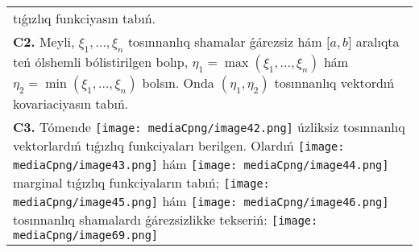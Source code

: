 \documentclass{article}
\begin{document}
\begin{tabular}{m{17cm}}
tıǵızlıq funkciyasın tabıń.
 \\
\textbf{C2.} Meyli, \(\xi_{1},...,\xi_{n}\) tosınnanlıq shamalar ǵárezsiz hám \(\lbrack a,b\rbrack\) aralıqta teń ólshemli bólistirilgen bolıp, \(\eta_{1} = \max\left( \xi_{1},...,\xi_{n} \right)\) hám \(\eta_{2} = \min\left( \xi_{1},...,\xi_{n} \right)\) bolsın. Onda \(\left( \eta_{1},\eta_{2} \right)\) tosınnanlıq vektordıń kovariaciyasın tabıń.
 \\
\textbf{C3.} Tómende \texttt{[image: mediaCpng/image42.png]} úzliksiz tosınnanlıq vektorlardıń tıǵızlıq funkciyaları berilgen. Olardıń \texttt{[image: mediaCpng/image43.png]} hám \texttt{[image: mediaCpng/image44.png]} marginal tıǵızlıq funkciyaların tabıń; \texttt{[image: mediaCpng/image45.png]} hám \texttt{[image: mediaCpng/image46.png]} tosınnanlıq shamalardı ǵárezsizlikke tekseriń: \texttt{[image: mediaCpng/image69.png]}
 \\

\end{tabular}
\vspace{1cm}
\end{document}
